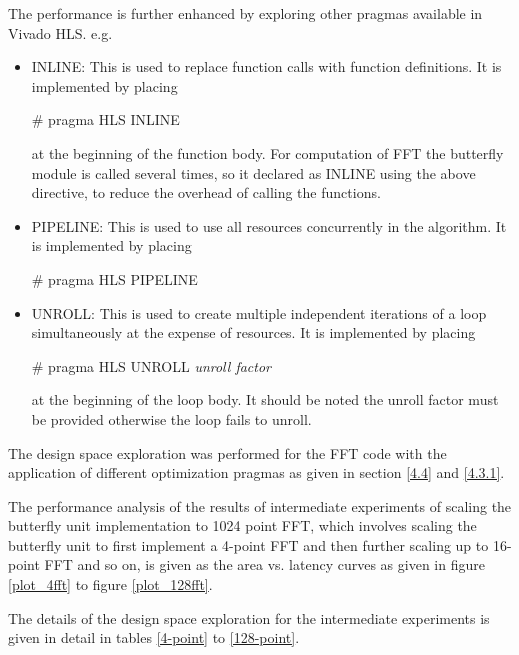 The performance is further enhanced by exploring other pragmas available in Vivado HLS. e.g.
\begin{itemize}
\item
INLINE: This is used to replace function calls with function definitions. It is implemented by placing

\hspace{3cm}\# pragma HLS INLINE

at the beginning of the function body.
For computation of FFT the butterfly module is called several times, so it declared as INLINE using the above directive, to reduce the overhead of calling the functions.
\item
PIPELINE: This is used to use all resources concurrently in the algorithm. It is implemented by placing

\hspace{3cm}\# pragma HLS PIPELINE

\item
UNROLL: This is used to create multiple independent iterations of a loop simultaneously at the expense of resources. It is implemented by placing

\hspace{3cm}\# pragma HLS UNROLL \textit{unroll factor}

at the beginning of the loop body.
It should be noted the unroll factor must be provided otherwise the loop fails to unroll.
\end{itemize}

\noindent The design space exploration was performed for the FFT code with the application of different optimization pragmas as given in section \ref{4.4} and \ref{4.3.1}.

\noindent The performance analysis of the results of intermediate experiments of scaling the butterfly unit implementation to 1024 point FFT, which involves scaling the butterfly unit to first implement a 4-point FFT and then further scaling up to 16-point FFT and so on, is given as the area vs. latency curves as given in figure \ref {plot_4fft} to figure \ref{plot_128fft}.

The details of the design space exploration for the intermediate experiments is given in detail in tables \ref{4-point} to \ref{128-point}.









